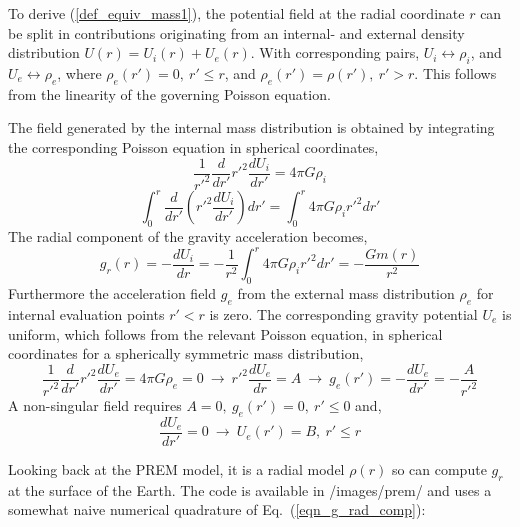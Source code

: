 To derive (\ref{def_equiv_mass1}), the potential field at the 
radial coordinate $r$ 
can be split in contributions originating from an internal- and external density 
distribution $U(r) = U_i (r) + U_e (r)$.
With corresponding pairs, 
$U_i \leftrightarrow \rho_i$, 
and
$U_e \leftrightarrow \rho_e$,
where
$\rho_e(r') = 0, ~r' \le r$,
and
$\rho_e(r') = \rho(r'), ~r' > r$.
This follows from the linearity of the governing Poisson equation.

The field generated by the internal mass distribution is obtained
by integrating the corresponding Poisson equation in spherical 
coordinates,
\begin{equation}
  \frac{1}{r'^2}
  \frac{d}{dr'} r'^2
  \frac{dU_i}{dr'}
   =
  4\pi G \rho_i
\end{equation}
\begin{equation}
  \int_0^r
      \frac{d}{dr'} \left ( r'^2 \frac{dU_i}{dr'} \right ) dr'
   =
  \int_0^r 4\pi G \rho_i r'^2 dr'
\end{equation}
The radial component of the gravity acceleration becomes,
\begin{equation}
   g_r(r) = - \frac{dU_i}{dr} 
          = - \frac{1}{r^2} \int_0^r 4\pi G \rho_i r'^2 dr'
          = - \frac{Gm(r)}{r^2}
\label{eqn_g_rad_comp}
\end{equation}
Furthermore the acceleration field $g_e$ from the external
mass distribution $\rho_e$ for internal evaluation points
$r'<r$ is zero.
The corresponding gravity potential $U_e$ is uniform,
which follows from the relevant Poisson equation,
in spherical coordinates for a spherically symmetric mass distribution,
\begin{equation}
   \frac{1}{r'^2} \frac{d}{dr'} r'^2 \frac{dU_e}{dr'}
    =
   4\pi G \rho_e 
    = 0
   ~\rightarrow~ 
   r'^2 \frac{dU_e}{dr} = A
   ~\rightarrow~ 
   g_e(r') = - \frac{dU_e}{dr'} = -\frac{A}{r'^2}
\end{equation}
A non-singular field requires $A=0,~g_e(r')=0,~r' \le 0$ and,
\begin{equation}
   \frac{dU_e}{dr'} = 0 ~\rightarrow~ U_e(r') = B,~r' \le r
\end{equation}

Looking back at the PREM model, it is a radial model $\rho(r)$ so 
can compute $g_r$ at the surface of the Earth. The code 
is available in /images/prem/ and uses a somewhat naive 
numerical quadrature of Eq.~(\ref{eqn_g_rad_comp}):

